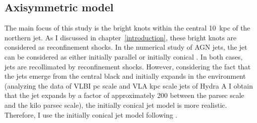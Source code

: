 \subsection{Axisymmetric model}
The main focus of this study is the bright knots within the central 10~kpc of the northern jet. As I discussed in chapter~\ref{introduction}, these bright knots are considered as reconfinement shocks. In the numerical study of AGN jets, the jet can be considered as either initially parallel \citep{sutherland07} or initially conical \citep{komissarov98, krause12}. In both cases, jets are recollimated by reconfinement shocks. However, considering the fact that the jets emerge from the central black and initially expands in the environment (analyzing the data of VLBI pc scale \citep{taylor96} and VLA kpc scale \citep{taylor90} jets of Hydra A I obtain that the jet expands by a factor of approximately 200 between the parsec scale and the kilo parsec scale), the initially conical jet model is more realistic. Therefore, I use the initially conical jet model following \citet{komissarov98}. 



